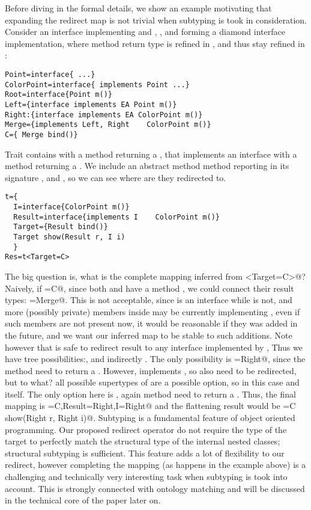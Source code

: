 Before diving in the formal details, we show an example motivating 
that expanding the redirect map is not trivial when subtyping is took in consideration.
Consider an interface \Q@ColorPoint@ implementing \Q@Point@
and \Q@Root@, \Q@Left@, \Q@Right@ and \Q@Merge@
forming a diamond interface implementation, where method 
\Q@m@ return type is refined in \Q@Right@, and thus stay refined in
\Q@Merge@:
\begin{lstlisting}
Point=interface{ ...}
ColorPoint=interface{ implements Point ...}
Root=interface{Point m()}
Left={interface implements EA Point m()}
Right:{interface implements EA ColorPoint m()}
Merge={implements Left, Right    ColorPoint m()}
C={ Merge bind()}
\end{lstlisting}
Trait \Q@t@ contains
 \Q@Target@ with a method returning a \Q@Result@,
that implements an interface \Q@I@ with a method returning a 
\Q@ColorPoint@.
We include an abstract method method 
\Q@show@ reporting in its signature 
\Q@Target@, \Q@Result@ and \Q@I@, so we can see where are they
redirected to.
\begin{lstlisting}
t={
  I=interface{ColorPoint m()}
  Result=interface{implements I    ColorPoint m()}
  Target={Result bind()}
  Target show(Result r, I i)
  }
Res=t<Target=C>
\end{lstlisting}
The big question is, what is the complete mapping inferred
from \Q@t<Target=C>@?
Naively, if \Q@Target=C@, since both \Q@Target@ and \Q@C@
have a method \Q@bind@, we could connect their result types: \Q@Result=Merge@.
This is not acceptable, since \Q@Result@ is an interface while \Q@Merge@ is not, and more (possibly private)
members inside \Q@t@ may be currently implementing \Q@Result@, even if such members are not present now,
it would be reasonable if they was added in the future, and we want our inferred map to be stable to such
additions. Note however that is safe to redirect result to any interface implemented by \Q@Merge@,
Thus we have tree possibilities:\Q@Left@, \Q@Right@ and indirectly \Q@Root@.
The only possibility is \Q@Result=Right@, since the method \Q@m@ need to
return a \Q@ColorPoint@.
However, \Q@Result@ implements \Q@I@, so also \Q@I@ need to be redirected, but to what?
all possible supertypes of \Q@Right@ are a possible option, so in this case \Q@Root@ and \Q@Right@ itself.
The only option here is \Q@Right@, again method \Q@m@ need to
return a \Q@ColorPoint@.
Thus, the final mapping is \Q@Target=C,Result=Right,I=Right@ and the flattening result would be
\Q@Res={C show(Right r, Right i)}@.
Subtyping is a fundamental feature of object oriented programming. Our proposed redirect operator
do not require the type of the target to perfectly match the structural type of the internal nested classes;
structural subtyping is sufficient.
This feature adds a lot of flexibility to our redirect,
however completing the mapping
(as happens in the example above) is a challenging and technically very interesting
task when subtyping is took into account. This is strongly connected with ontology matching and
will be discussed in the technical core of the paper later on.

